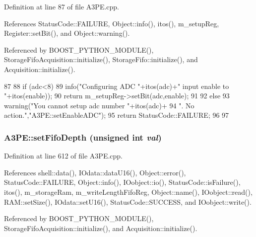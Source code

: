 Definition at line 87 of file A3PE.cpp.

References StatusCode::FAILURE, Object::info(), itos(), m\_\-setupReg, Register::setBit(), and Object::warning().

Referenced by BOOST\_\-PYTHON\_\-MODULE(), StorageFifoAcquisition::initialize(), StorageFifo::initialize(), and Acquisition::initialize().


\begin{DoxyCode}
87                                                           {
88   if (adc<8){
89     info("Configuring ADC "+itos(adc)+" input enable to "+itos(enable));
90     return m_setupReg->setBit(adc,enable);
91   }
92   else{
93     warning("You cannot setup adc number "+itos(adc)+
94         ". No action.","A3PE::setEnableADC");
95     return StatusCode::FAILURE;
96   }
97 }
\end{DoxyCode}
\hypertarget{classA3PE_a4d8f78a1b09b409f288b34d503c71146}{
\subsubsection[{setFifoDepth}]{ A3PE::setFifoDepth (unsigned int {\em val})}}
\label{classA3PE_a4d8f78a1b09b409f288b34d503c71146}


Definition at line 612 of file A3PE.cpp.

References shell::data(), IOdata::dataU16(), Object::error(), StatusCode::FAILURE, Object::info(), IOobject::io(), StatusCode::isFailure(), itos(), m\_\-storageRam, m\_\-writeLengthFifoReg, Object::name(), IOobject::read(), RAM::setSize(), IOdata::setU16(), StatusCode::SUCCESS, and IOobject::write().

Referenced by BOOST\_\-PYTHON\_\-MODULE(), StorageFifoAcquisition::initialize(), and Acquisition::initialize().



